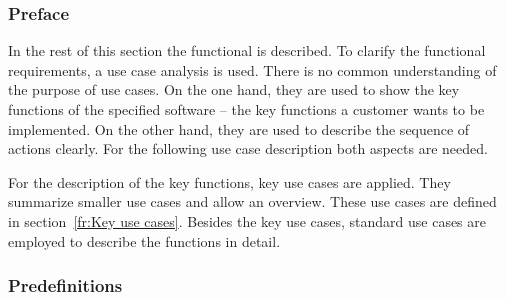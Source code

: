 \subsubsection{Preface}
In the rest of this section the functional  is described. To clarify the functional requirements, a use case analysis is used. There is no common understanding of the purpose of use cases. On the one hand, they are used to show the key functions of the specified software -- the key functions a customer wants to be implemented. On the other hand, they are used to describe the sequence of actions clearly. For the following use case description both aspects are needed.
\par
For the description of the key functions, key use cases are applied. They summarize smaller use cases and allow an overview. These use cases are defined in section~\ref{fr:Key use cases}. Besides the key use cases, standard use cases are employed to describe the functions in detail.

\subsubsection{Predefinitions}
